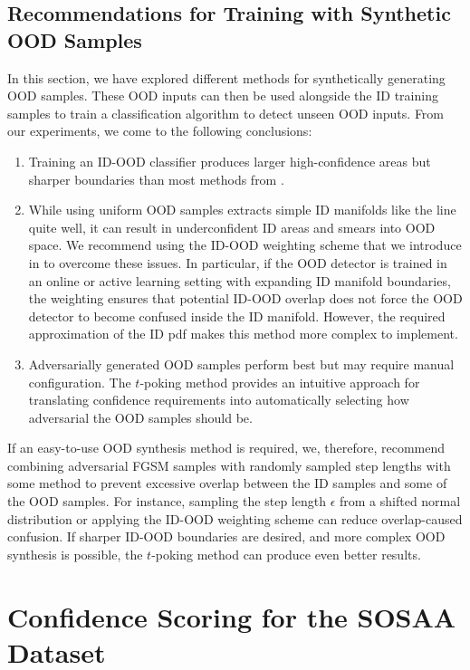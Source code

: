 \subsection{Recommendations for Training with Synthetic OOD Samples}

In this section, we have explored different methods for synthetically generating OOD samples. These OOD inputs can then be used alongside the ID training samples to train a classification algorithm to detect unseen OOD inputs. From our experiments, we come to the following conclusions:
\begin{enumerate}
    \item Training an ID-OOD classifier produces larger high-confidence areas but sharper boundaries than most methods from .
    \item While using uniform OOD samples extracts simple ID manifolds like the line quite well, it can result in underconfident ID areas and smears into OOD space. We recommend using the ID-OOD weighting scheme that we introduce in  to overcome these issues. In particular, if the OOD detector is trained in an online or active learning setting with expanding ID manifold boundaries, the weighting ensures that potential ID-OOD overlap does not force the OOD detector to become confused inside the ID manifold. However, the required approximation of the ID pdf makes this method more complex to implement.
    \item Adversarially generated OOD samples perform best but may require manual configuration. The $t$-poking method provides an intuitive approach for translating confidence requirements into automatically selecting how adversarial the OOD samples should be.
\end{enumerate}
\noindent If an easy-to-use OOD synthesis method is required, we, therefore, recommend combining adversarial FGSM samples with randomly sampled step lengths with some method to prevent excessive overlap between the ID samples and some of the OOD samples. For instance, sampling the step length $\epsilon$ from a shifted normal distribution or applying the ID-OOD weighting scheme can reduce overlap-caused confusion. If sharper ID-OOD boundaries are desired, and more complex OOD synthesis is possible, the $t$-poking method can produce even better results.

\section{Confidence Scoring for the SOSAA Dataset} \label{txt:confidence-scoring-comparison}

